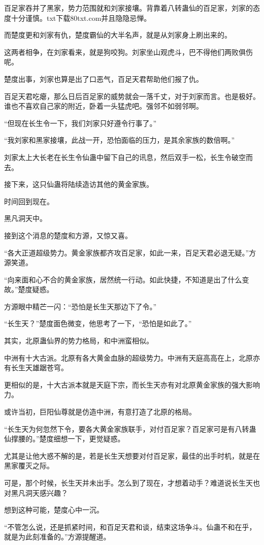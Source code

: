 \begin{this_body}
百足家吞并了黑家，势力范围就和刘家接壤。背靠着八转蛊仙的百足家，刘家的态度十分谨慎。txt下载80txt.com并且隐隐忌惮。

而楚度更和刘家有仇，楚度霸仙的大半名声，就是从刘家身上刷出来的。

这两者相争，在刘家看来，就是狗咬狗。刘家坐山观虎斗，巴不得他们两败俱伤呢。

楚度出事，刘家也算是出了口恶气，百足天君帮助他们报了仇。

百足天君吃瘪，那么日后百足家的威势就会一落千丈，对于刘家而言。也是极好。谁也不喜欢自己家的附近，卧着一头猛虎吧。强邻不如弱邻啊。

“但现在长生令一下，我们刘家只好遵令行事了。”

“我刘家和黑家接壤，此战一开，恐怕面临的压力，是其余家族的数倍啊。”

刘家太上大长老在长生令仙蛊中留下自己的讯息，然后双手一松，长生令破空而去。

接下来，这只仙蛊将陆续造访其他的黄金家族。

时间回到现在。

黑凡洞天中。

接到这个消息的楚度和方源，又惊又喜。

“各大正道超级势力。黄金家族都齐攻百足家，如此一来，百足天君必退无疑。”方源笑道。

“向来面和心不合的黄金家族，居然统一行动。如此快捷，不知道是出了什么变故。”楚度疑惑。

方源眼中精芒一闪：“恐怕是长生天那边下了令。”

“长生天？”楚度面色微变，他思考了一下，“恐怕是如此了。”

其实，北原蛊仙界的势力格局，和中洲蛮相似。

中洲有十大古派。北原有各大黄金血脉的超级势力。中洲有天庭高高在上，北原亦有长生天雄踞苍穹。

更相似的是，十大古派本就是天庭下宗，而长生天亦有对北原黄金家族的强大影响力。

或许当初，巨阳仙尊就是仿造中洲，有意打造了北原的格局。

“长生天为何忽然下令，要各大黄金家族联手，对付百足家？百足家可是有八转蛊仙撑腰的。”楚度细想一下，更觉疑惑。

尤其是让他大惑不解的是，若是长生天想要对付百足家，最佳的出手时机，就是在黑家覆灭之际。

可是，那个时候，长生天并未出手。怎么到了现在，才想着动手？难道说长生天也对黑凡洞天感兴趣？

想到这种可能，楚度心中一沉。

“不管怎么说，还是抓紧时间，和百足天君和谈，结束这场争斗。仙蛊不和在乎，就是为此刻准备的。”方源提醒道。


\end{this_body}
